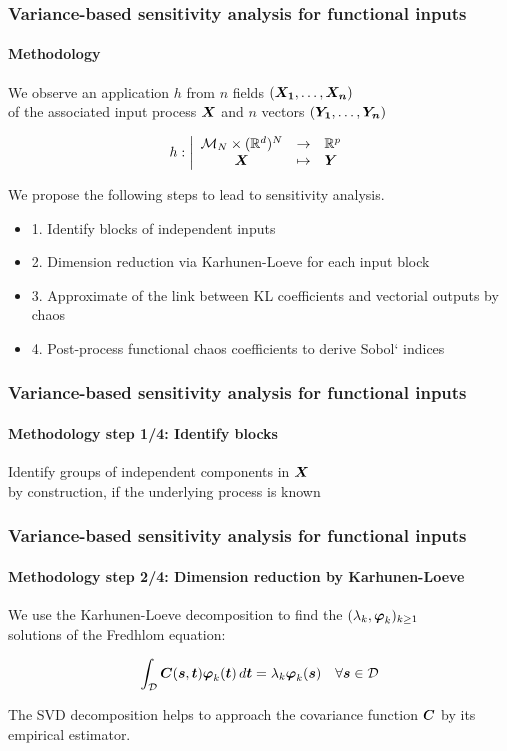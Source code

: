 \documentclass[aspectratio=169]{beamer}
\date[]{UserDay \#15, 10 June 2022, EDF Lab Saclay}
\begin{document}

\begin{frame}
\frametitle{Variance-based sensitivity analysis for functional inputs}

\framesubtitle{Methodology}

We observe an application $h$ from $n$ fields $({{\mathbf{\boldsymbol{{{\mathbf{\boldsymbol{{X_1}}}}}}}}}, \dots, {{\mathbf{\boldsymbol{{{\mathbf{\boldsymbol{{X_n}}}}}}}}})$ \\
of the associated input process ${{\mathbf{\boldsymbol{{{\mathbf{\boldsymbol{{X}}}}}}}}}$ and $n$ vectors $({\mathbf{\boldsymbol{{Y_1}}}},\dots,{\mathbf{\boldsymbol{{Y_n}}}})$

$$
h: \left|
  \begin{array}{ccl}
      {\mathcal M}_N \times (\mathbb{R}^d)^N & \rightarrow & \mathbb{R}^p \\
      {{\mathbf{\boldsymbol{{{\mathbf{\boldsymbol{{X}}}}}}}}} & \mapsto & {\mathbf{\boldsymbol{{Y}}}}
  \end{array}
\right.
$$

\vspace{10mm}

We propose the following steps to lead to sensitivity analysis.

\begin{itemize}
\item 1. Identify blocks of independent inputs
\item 2. Dimension reduction via Karhunen-Loeve for each input block
\item 3. Approximate of the link between KL coefficients and vectorial outputs by chaos
\item 4. Post-process functional chaos coefficients to derive Sobol` indices
\end{itemize}

\end{frame}


\begin{frame}
\frametitle{Variance-based sensitivity analysis for functional inputs}

\framesubtitle{Methodology step 1/4: Identify blocks}

Identify groups of independent components in ${{\mathbf{\boldsymbol{{{\mathbf{\boldsymbol{{X}}}}}}}}}$\\
by construction, if the underlying process is known


\end{frame}


\begin{frame}
\frametitle{Variance-based sensitivity analysis for functional inputs}

\framesubtitle{Methodology step 2/4: Dimension reduction by Karhunen-Loeve}

We use the Karhunen-Loeve decomposition to find the $(\lambda_k, {\mathbf{\boldsymbol{{\varphi}}}}_k)_{k \geq 1}$ \\
solutions of the Fredhlom equation:

$$
\int_{{\mathcal D}} {{\mathbf{\boldsymbol{{{\mathbf{\boldsymbol{{C}}}}}}}}}({\mathbf{\boldsymbol{{s}}}},{\mathbf{\boldsymbol{{t}}}}) {\mathbf{\boldsymbol{{\varphi}}}}_k({\mathbf{\boldsymbol{{t}}}})\,  d{\mathbf{\boldsymbol{{t}}}} = \lambda_k  {\mathbf{\boldsymbol{{\varphi}}}}_k({\mathbf{\boldsymbol{{s}}}}) \quad \forall {\mathbf{\boldsymbol{{s}}}} \in {\mathcal D}
$$

The SVD decomposition helps to approach the covariance function ${{\mathbf{\boldsymbol{{{\mathbf{\boldsymbol{{C}}}}}}}}}$ by its empirical estimator.

\end{frame}
\end{document}
